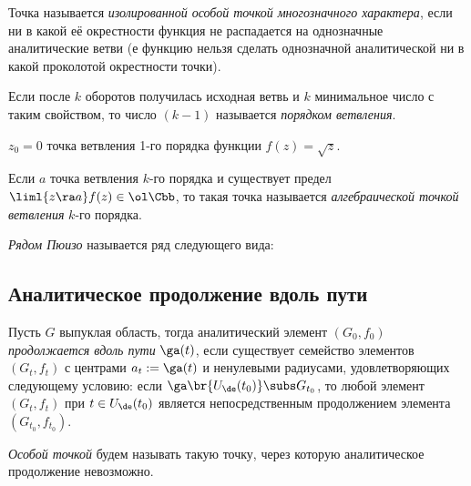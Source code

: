 \documentclass[a4paper]{article}
\begin{document}
\begin{theorem}
\begin{df}
Точка называется \emph{изолированной особой точкой многозначного характера}, если ни в какой её окрестности функция не
распадается на однозначные аналитические ветви (е функцию нельзя сделать однозначной аналитической ни в какой
проколотой окрестности точки).

Если после $k$ оборотов получилась исходная ветвь и $k$ минимальное число с таким свойством,
то число $(k-1)$ называется \emph{порядком ветвления}.
\end{df}

\begin{ex}
$z_0=0$ точка ветвления 1-го порядка функции $f(z)=\sqrt{z}$.
\end{ex}

\begin{df}
Если $a$  точка ветвления  $k$-го порядка и существует предел $\liml{z\ra a} f(z) \in \ol \Cbb$,
то такая точка называется \emph{алгебраической точкой ветвления} $k$-го порядка.
\end{df}

\begin{df}
\emph{Рядом Пюизо} называется ряд следующего вида:
\end{df}

\begin{ex}
\end{ex}

\subsection{Аналитическое продолжение вдоль пути}

\begin{df}
Пусть $G$ выпуклая область, тогда аналитический элемент $(G_0,f_0)$ \emph{продолжается
вдоль пути} $\ga(t)$, если существует семейство элементов $(G_t,f_t)$ с центрами $a_t := \ga(t)$ и ненулевыми
радиусами, удовлетворяющих следующему условию: если $\ga\br{U_\de(t_0)} \subs G_{t_0}$, то любой элемент $(G_t,f_t)$ при
$t \in U_\de(t_0)$ является непосредственным продолжением элемента $(G_{t_0},f_{t_0})$.
\end{df}

\begin{df}
\emph{Особой точкой} будем называть такую точку, через которую аналитическое продолжение невозможно.
\end{df}


\end{theorem}
\end{document}
